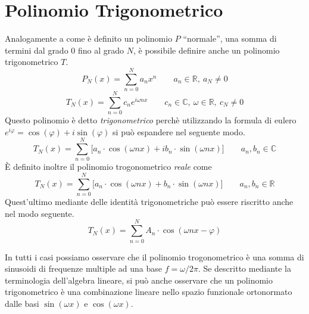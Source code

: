 
\section{Polinomio Trigonometrico}
Analogamente a come \`e definito un polinomio \(P\) ``normale'', una somma di
termini dal grado 0 fino al grado \(N\), \`e possibile definire anche un
polinomio trigonometrico \(T\).
\[
    P_N(x) = \sum_{n=0}^N a_n x^n \qquad a_n \in \mathbb{R},~ a_N \neq 0
\]
\[
    T_N(x) = \sum_{n=0}^N c_n e^{i\omega nx} 
        \qquad c_n \in\mathbb{C},~\omega\in\mathbb{R}, ~ c_N \neq 0
\]
Questo polinomio \`e detto \emph{trigonometrico} perch\`e utilizzando la
formula di eulero \(e^{i\varphi} = \cos(\varphi) + i\sin(\varphi)\) si pu\`o
espandere nel seguente modo.
\[
    T_N(x) = \sum_{n=0}^N\big [a_n\cdot\cos(\omega nx) + ib_n\cdot\sin(\omega nx)]
    \qquad a_n, b_n \in \mathbb{C}
\]
\`E definito inoltre il polinomio trogonometrico \emph{reale} come
\[
    T_N(x) = \sum_{n=0}^N\big [a_n\cdot\cos(\omega nx) + b_n\cdot\sin(\omega nx)]
    \qquad a_n, b_n \in \mathbb{R}
\]
Quest'ultimo mediante delle identit\`a trigonometriche pu\`o essere riscritto
anche nel modo seguente.
\[
    T_N(x) = \sum_{n=0}^N A_n\cdot\cos(\omega nx - \varphi)
\]

In tutti i casi possiamo osservare che il polinomio trogonometrico \`e una
somma di sinusoidi di frequenze multiple ad una base \(f = \omega/2\pi\).  Se
descritto mediante la terminologia dell'algebra lineare, si pu\`o anche
osservare che un polinomio trigonometrico \`e una combinazione lineare nello
spazio funzionale ortonormato dalle basi \(\sin(\omega x)\) e \(\cos(\omega
x)\).


